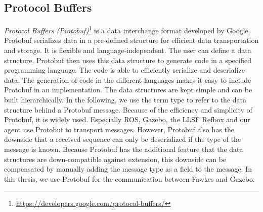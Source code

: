 \subsection{Protocol Buffers}
\textit{Protocol Buffers (Protobuf)}\footnote{\url{https://developers.google.com/protocol-buffers/}} is a data interchange format developed by Google. Protobuf serializes data in a pre-defined structure for efficient data transportation and storage. It is flexible and language-independent. The user can define a data structure. Protobuf then uses this data structure to generate code in a specified programming language. The code is able to efficiently serialize and deserialize data. The generation of code in the different languages makes it easy to include Protobuf in an implementation. The data structures are kept simple and can be built hierarchically. In the following, we use the term type to refer to the data structure behind a Protobuf message. Because of the efficiency and simplicity of Protobuf, it is widely used. Especially ROS, Gazebo, the LLSF Refbox and our agent use Protobuf to transport messages. However, Protobuf also has the downside that a received sequence can only be deserialized if the type of the message is known. Because Protobuf has the additional feature that the data structures are down-compatible against extension, this downside can be compensated by manually adding the message type as a field to the message. In this thesis, we use Protobuf for the communication between Fawkes and Gazebo.

